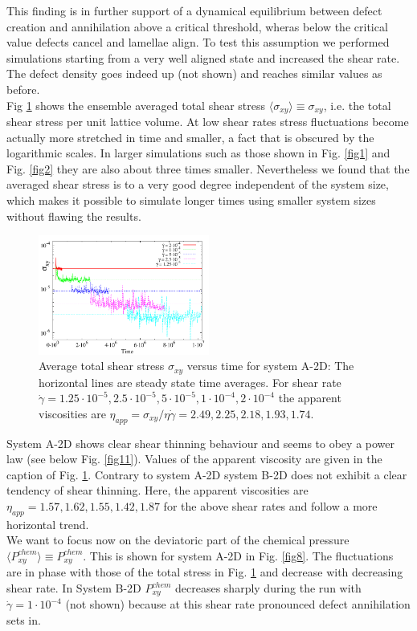 \documentclass[8.5pt,twoside,twocolumn]{article}
\newcommand{\e}[1]{\cdot10^{#1}}
\newcommand{\gd}{\dot{\gamma}}
\begin{document}
This finding is in further support of a dynamical equilibrium between defect creation and annihilation above a critical threshold, wheras below the critical value defects cancel and lamellae align.
To test this assumption we performed simulations starting from a very well aligned state and increased the shear rate.
The defect density goes indeed up (not shown) and reaches similar values as before.\\
Fig \ref{fig7} shows the ensemble averaged total shear stress $\langle \sigma_{xy}\rangle \equiv\sigma_{xy} $, i.e. the total shear stress per unit lattice volume.
At low shear rates stress fluctuations become actually more stretched in time and smaller, a fact that is obscured by the logarithmic scales.
In larger simulations such as those shown in Fig. \ref{fig1} and Fig. \ref{fig2} they are also about three times smaller.
Nevertheless we found that the averaged shear stress is to a very good degree independent of the system size, which makes it possible to simulate longer times using smaller system sizes without flawing the results.

\begin{figure}[htp!]
\centering
\includegraphics[angle=0,width=0.5\textwidth]{S_xy_tot_t_5e-4.pdf}
\caption{Average total shear stress $\sigma_{xy}$ versus time for system A-2D: The horizontal lines are steady state time averages. For shear rate $\dot{\gamma}=1.25\e{-5}, 2.5\e{-5}, 5\e{-5}, 1\e{-4}, 2\e{-4}$ the apparent viscosities are $\eta_{app}=\sigma_{xy}/ \eta \dot{\gamma}=2.49, 2.25, 2.18, 1.93, 1.74$.
 }
\label{fig7}
\end{figure}

System A-2D shows clear shear thinning behaviour and seems to obey a power law (see below Fig. \ref{fig11}).
Values of the apparent viscosity are given in the caption of Fig. \ref{fig7}.
Contrary to system A-2D system B-2D does not exhibit a clear tendency of shear thinning.
Here, the apparent viscosities are $\eta_{app}=1.57, 1.62, 1.55, 1.42, 1.87$ for the above shear rates and follow a more horizontal trend.\\
We want to focus now on the deviatoric part of the chemical pressure $\langle P^{chem}_{xy}\rangle\equiv P^{chem}_{xy}$.
This is shown for system A-2D in Fig. \ref{fig8}.
The fluctuations are in phase with those of the total stress in Fig. \ref{fig7} and decrease with decreasing shear rate.
In System B-2D $P^{chem}_{xy}$ decreases sharply during the run with $\gd=1\e{-4}$ (not shown) because at this shear rate pronounced defect annihilation sets in.\\
\end{document}
